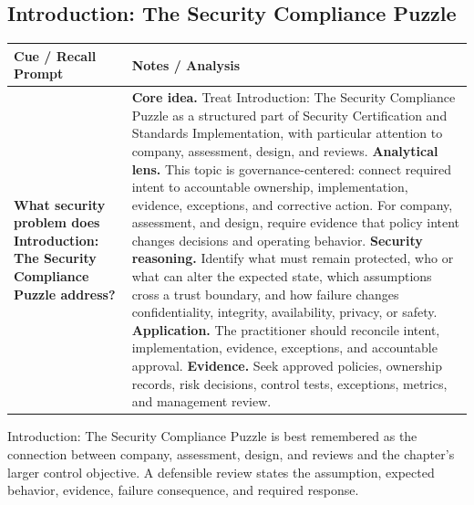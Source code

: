 \documentclass[11pt]{article}
\newcommand{\CornellHeader}{%
\rowcolor{Navy}\color{white}\bfseries Cue / Recall Prompt & \color{white}\bfseries Notes / Analysis\\\hline}
\newcommand{\CornellRow}[2]{%
\cellcolor{CueGray}\RaggedRight\textbf{#1} & \RaggedRight #2\\\hline}
\begin{document}
\subsection*{Introduction: The Security Compliance Puzzle}
\begin{longtable}{>{\RaggedRight\arraybackslash}p{}|>{\RaggedRight\arraybackslash}p{}}
\CornellHeader
\CornellRow{What security problem does Introduction: The Security Compliance Puzzle address?}{\textbf{Core idea.} Treat Introduction: The Security Compliance Puzzle as a structured part of Security Certification and Standards Implementation, with particular attention to company, assessment, design, and reviews. \textbf{Analytical lens.} This topic is governance-centered: connect required intent to accountable ownership, implementation, evidence, exceptions, and corrective action. For company, assessment, and design, require evidence that policy intent changes decisions and operating behavior. \textbf{Security reasoning.} Identify what must remain protected, who or what can alter the expected state, which assumptions cross a trust boundary, and how failure changes confidentiality, integrity, availability, privacy, or safety. \textbf{Application.} The practitioner should reconcile intent, implementation, evidence, exceptions, and accountable approval. \textbf{Evidence.} Seek approved policies, ownership records, risk decisions, control tests, exceptions, metrics, and management review.}
\end{longtable}
\begin{topicsummary}
Introduction: The Security Compliance Puzzle is best remembered as the connection between company, assessment, design, and reviews and the chapter's larger control objective. A defensible review states the assumption, expected behavior, evidence, failure consequence, and required response.
\end{topicsummary}
\end{document}
